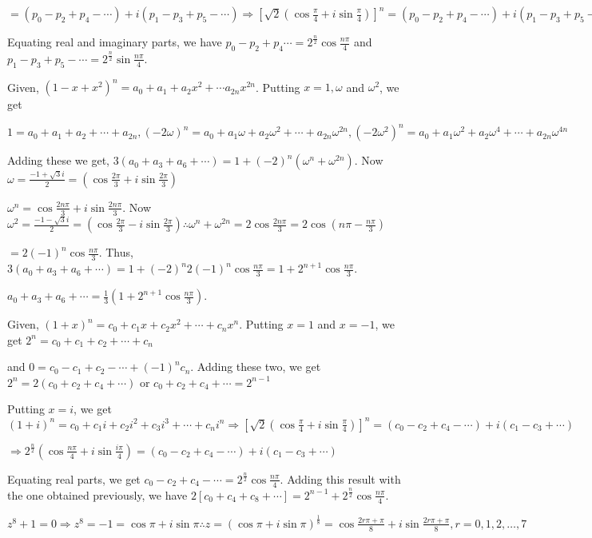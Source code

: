   $= (p_0 - p_2 + p_4 - \cdots) + i(p_1 - p_3 + p_5 - \cdots)\Rightarrow \left[\sqrt{2}\left(\cos\frac{\pi}{4} +
  i\sin\frac{\pi}{4}\right)\right]^n = (p_0 - p_2 + p_4 - \cdots) + i(p_1 - p_3 + p_5 - \cdots)$

  Equating real and imaginary parts, we have $p_0 - p_2 + p_4 \cdots = 2^{\frac{n}{2}}\cos\frac{n\pi}{4}$ and
  $p_1 - p_3 + p_5 - \cdots = 2^{\frac{n}{2}}\sin\frac{n\pi}{4}$.
\item Given, $(1 - x + x^2)^n = a_0 + a_1 + a_2x^2 + \cdots a_{2n}x^{2n}$. Putting $x = 1, \omega$ and $\omega^2$, we get

  $1 = a_0 + a_1 + a_2 + \cdots + a_{2n}, (-2\omega)^n = a_0 + a_1\omega + a_2\omega^2 + \cdots +
  a_{2n}\omega^{2n}, (-2\omega^2)^n = a_0 + a_1\omega^2 + a_2\omega^4 + \cdots +
  a_{2n}\omega^{4n}$

  Adding these we get, $3(a_0 + a_3 + a_6 + \cdots) = 1 + (-2)^n(\omega^n + \omega^{2n})$. Now $\omega =
  \frac{-1 + \sqrt{3}i}{2} = \left(\cos\frac{2\pi}{3} + i\sin \frac{2\pi}{3}\right)$

  $\omega^n = \cos\frac{2n\pi}{3} + i\sin\frac{2n\pi}{3}$. Now $\omega^2 = \frac{-1 - \sqrt{3}i}{2} =
  \left(\cos\frac{2\pi}{3} - i\sin \frac{2\pi}{3}\right)\therefore \omega^n + \omega^{2n} =
  2\cos\frac{2n\pi}{3} = 2\cos\left(n\pi - \frac{n\pi}{3}\right)$

  $= 2(-1)^n\cos\frac{n\pi}{3}$. Thus, $3(a_0 + a_3 + a_6 + \cdots) = 1 + (-2)^n2(-1)^n\cos\frac{n\pi}{3} = 1 +2^{n + 1}\cos\frac{n\pi}{3}$.

  $a_0 + a_3 + a_6 + \cdots = \frac{1}{3}\left(1 + 2^{n+1}\cos\frac{n\pi}{3}\right)$.
\item Given, $(1 + x)^n = c_0 + c_1x + c_2x^2 + \cdots + c_nx^n$. Putting $x = 1$ and $x = -1$, we get $2^n = c_0 + c_1 + c_2 + \cdots + c_n$

  and $0 = c_0 - c_1 + c_2 - \cdots + (-1)^nc_n$. Adding these two, we get $2^n = 2(c_0 + c_2 + c_4 +
  \cdots)$ or $c_0 + c_2 + c_4 + \cdots = 2^{n - 1}$

  Putting $x = i$, we get $(1 + i)^n = c_0 + c_1i + c_2i^2 + c_3i^3 + \cdots + c_ni^n\Rightarrow
  \left[\sqrt{2}\left(\cos\frac{\pi}{4}+i\sin\frac{\pi}{4}\right)\right]^n = (c_0 -c_2 + c_4 - \cdots) +
  i(c_1 - c_3 + \cdots)$

  $\Rightarrow 2^{\frac{n}{2}}\left(\cos\frac{n\pi}{4}+i\sin\frac{i\pi}{4}\right) = (c_0 -c_2 + c_4 - \cdots) + i(c_1 - c_3 + \cdots)$

  Equating real parts, we get $c_0 - c_2 + c_4 - \cdots = 2^{\frac{n}{2}}\cos\frac{n\pi}{4}$. Adding this
  result with the one obtained previously, we have $2[c_0 + c_4 + c_8 + \cdots] = 2^{n - 1} + 2^{\frac{n}{2}}\cos\frac{n\pi}{4}$.
\item $z^8 + 1 = 0 \Rightarrow z^8 = -1 = \cos\pi + i \sin\pi\therefore z = (\cos\pi + i \sin\pi)^{\frac{1}{8}} =
  \cos\frac{2r\pi + \pi}{8} + i \sin\frac{2r\pi + \pi}{8}, r = 0, 1, 2, \ldots, 7$

